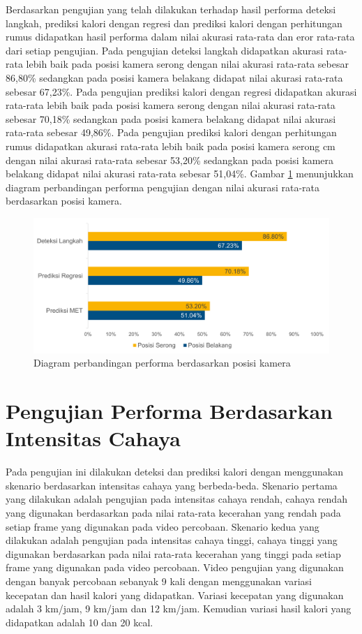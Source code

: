 Berdasarkan pengujian yang telah dilakukan terhadap hasil performa deteksi langkah, prediksi kalori dengan regresi dan prediksi kalori dengan perhitungan rumus didapatkan hasil performa dalam nilai akurasi rata-rata dan eror rata-rata dari setiap pengujian. Pada pengujian deteksi langkah didapatkan akurasi rata-rata lebih baik pada posisi kamera serong dengan nilai akurasi rata-rata sebesar 86,80\% sedangkan pada posisi kamera belakang didapat nilai akurasi rata-rata sebesar 67,23\%. Pada pengujian prediksi kalori dengan regresi didapatkan akurasi rata-rata lebih baik pada posisi kamera serong dengan nilai akurasi rata-rata sebesar 70,18\% sedangkan pada posisi kamera belakang didapat nilai akurasi rata-rata sebesar 49,86\%. Pada pengujian prediksi kalori dengan perhitungan rumus didapatkan akurasi rata-rata lebih baik pada posisi kamera serong cm dengan nilai akurasi rata-rata sebesar 53,20\% sedangkan pada posisi kamera belakang didapat nilai akurasi rata-rata sebesar 51,04\%. Gambar \ref{fig:DiagramPosisi} menunjukkan diagram perbandingan performa pengujian dengan nilai akurasi rata-rata berdasarkan posisi kamera.

\begin{figure}[H]
  \centering
  \includegraphics[scale=0.7]{gambar/diagram_posisi.png}
  \caption{Diagram perbandingan performa berdasarkan posisi kamera}
  \label{fig:DiagramPosisi}
\end{figure}

\section{Pengujian Performa Berdasarkan Intensitas Cahaya}
\label{sec:PengujianIntensitas}

Pada pengujian ini dilakukan deteksi dan prediksi kalori dengan menggunakan skenario berdasarkan intensitas cahaya yang berbeda-beda. Skenario pertama yang dilakukan adalah pengujian pada intensitas cahaya rendah, cahaya rendah yang digunakan berdasarkan pada nilai rata-rata kecerahan yang rendah pada setiap frame yang digunakan pada video percobaan. Skenario kedua yang dilakukan adalah pengujian pada intensitas cahaya tinggi, cahaya tinggi yang digunakan berdasarkan pada nilai rata-rata kecerahan yang tinggi pada setiap frame yang digunakan pada video percobaan. Video pengujian yang digunakan dengan banyak percobaan sebanyak 9 kali dengan menggunakan variasi kecepatan dan hasil kalori yang didapatkan. Variasi kecepatan yang digunakan adalah 3 km/jam, 9 km/jam dan 12 km/jam. Kemudian variasi hasil kalori yang didapatkan adalah 10 dan 20 kcal. 

